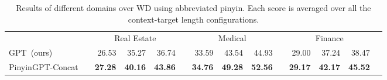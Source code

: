 \begin{table*}[!htp]
\begin{tabular}{lrrrrrrrrrrrrr}
& &\multicolumn{3}{c}{Real Estate} & &\multicolumn{3}{c}{Medical} & &\multicolumn{3}{c}{Finance} \\\cmidrule{3-5}\cmidrule{7-9}\cmidrule{11-13}
GPT~(ours) & &26.53 &35.27 &36.74 & &33.59 &43.54 &44.93 & &29.00 &37.24 &38.47 \\
PinyinGPT-Concat & &\textbf{27.28} &\textbf{40.16} &\textbf{43.86} &\textbf{} &\textbf{34.76} &\textbf{49.28} &\textbf{52.56} &\textbf{} &\textbf{29.17} &\textbf{42.17} &\textbf{45.52} \\
\bottomrule
\end{tabular}
\caption{Results of different domains over WD using abbreviated pinyin. Each score is averaged over all the context-target length configurations.}
\label{tab:domain}
\end{table*}


